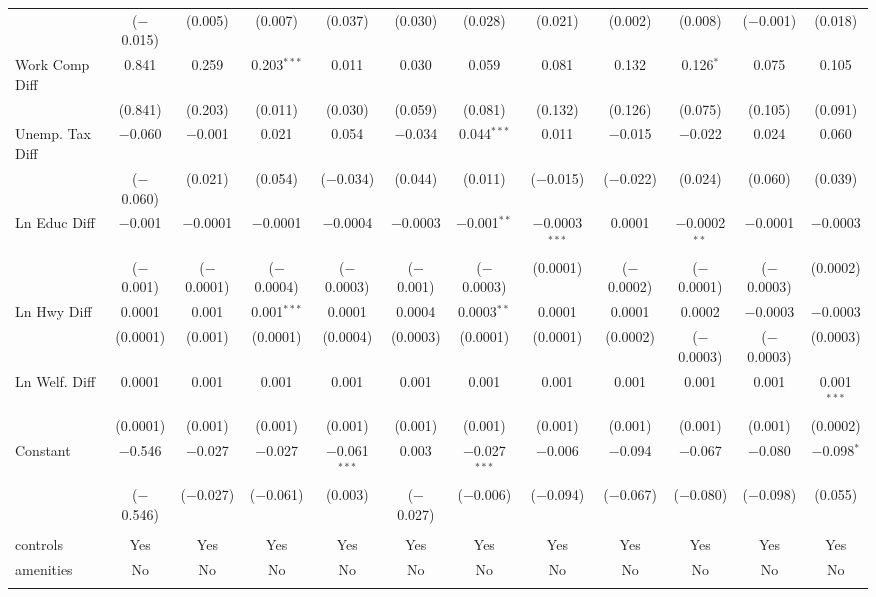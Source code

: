 \begin{table}[!htbp]
\begin{tabular}{@{\extracolsep{5pt}}lccccccccccc}
  & ($-$0.015) & (0.005) & (0.007) & (0.037) & (0.030) & (0.028) & (0.021) & (0.002) & (0.008) & ($-$0.001) & (0.018) \\ 
  Work Comp Diff & 0.841 & 0.259 & 0.203$^{***}$ & 0.011 & 0.030 & 0.059 & 0.081 & 0.132 & 0.126$^{*}$ & 0.075 & 0.105 \\ 
  & (0.841) & (0.203) & (0.011) & (0.030) & (0.059) & (0.081) & (0.132) & (0.126) & (0.075) & (0.105) & (0.091) \\ 
  Unemp. Tax Diff & $-$0.060 & $-$0.001 & 0.021 & 0.054 & $-$0.034 & 0.044$^{***}$ & 0.011 & $-$0.015 & $-$0.022 & 0.024 & 0.060 \\ 
  & ($-$0.060) & (0.021) & (0.054) & ($-$0.034) & (0.044) & (0.011) & ($-$0.015) & ($-$0.022) & (0.024) & (0.060) & (0.039) \\ 
  Ln Educ Diff & $-$0.001 & $-$0.0001 & $-$0.0001 & $-$0.0004 & $-$0.0003 & $-$0.001$^{**}$ & $-$0.0003$^{***}$ & 0.0001 & $-$0.0002$^{**}$ & $-$0.0001 & $-$0.0003 \\ 
  & ($-$0.001) & ($-$0.0001) & ($-$0.0004) & ($-$0.0003) & ($-$0.001) & ($-$0.0003) & (0.0001) & ($-$0.0002) & ($-$0.0001) & ($-$0.0003) & (0.0002) \\ 
  Ln Hwy Diff & 0.0001 & 0.001 & 0.001$^{***}$ & 0.0001 & 0.0004 & 0.0003$^{**}$ & 0.0001 & 0.0001 & 0.0002 & $-$0.0003 & $-$0.0003 \\ 
  & (0.0001) & (0.001) & (0.0001) & (0.0004) & (0.0003) & (0.0001) & (0.0001) & (0.0002) & ($-$0.0003) & ($-$0.0003) & (0.0003) \\ 
  Ln Welf. Diff & 0.0001 & 0.001 & 0.001 & 0.001 & 0.001 & 0.001 & 0.001 & 0.001 & 0.001 & 0.001 & 0.001$^{***}$ \\ 
  & (0.0001) & (0.001) & (0.001) & (0.001) & (0.001) & (0.001) & (0.001) & (0.001) & (0.001) & (0.001) & (0.0002) \\ 
  Constant & $-$0.546 & $-$0.027 & $-$0.027 & $-$0.061$^{***}$ & 0.003 & $-$0.027$^{***}$ & $-$0.006 & $-$0.094 & $-$0.067 & $-$0.080 & $-$0.098$^{*}$ \\ 
  & ($-$0.546) & ($-$0.027) & ($-$0.061) & (0.003) & ($-$0.027) & ($-$0.006) & ($-$0.094) & ($-$0.067) & ($-$0.080) & ($-$0.098) & (0.055) \\ 
 \hline \\[-1.8ex] 
controls & Yes & Yes & Yes & Yes & Yes & Yes & Yes & Yes & Yes & Yes & Yes \\ 
amenities & No & No & No & No & No & No & No & No & No & No & No \\ 
\hline \\[-1.8ex] 

\end{tabular}
\end{table}
